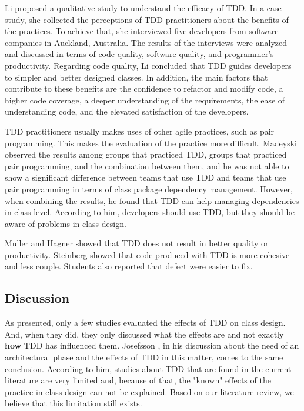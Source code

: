 \documentclass[times]{speauth}
\begin{document}
Li \cite{angela-li} proposed a qualitative study to understand the efficacy of TDD.
In a case study, she collected the perceptions of TDD practitioners about the
benefits of the practices. To achieve that, she interviewed five developers
from software companies in Auckland, Australia. The results of the interviews
were analyzed and discussed in terms of code quality, software quality, and
programmer's productivity. Regarding code quality, Li concluded that TDD
guides developers to simpler and better designed classes. In addition, the main
factors that contribute to these benefits are the confidence to refactor and
modify code, a higher code coverage, a deeper understanding of the requirements,
the ease of understanding code, and the elevated
satisfaction of the developers.

TDD practitioners usually makes uses of other agile practices, such as
pair programming. This makes the evaluation of the practice more difficult.
Madeyski \cite{madeyski-package-dependencies} observed the results
among groups that practiced TDD, groups that practiced pair programming,
and the combination between them, and he was not able to show a significant
difference between teams that use TDD and teams that use pair programming
in terms of class package dependency management. However, when combining
the results, he found that TDD can help managing dependencies in class level.
According to him, developers should use TDD, but they should be aware of 
problems in class design.

Muller and Hagner \cite{muller-e-hagner} showed that TDD does not result in
better quality or productivity. Steinberg \cite{steinberg} showed that
code produced with TDD is more cohesive and less couple. Students also reported
that defect were easier to fix.

\subsection{Discussion}

As presented, only a few studies evaluated the effects of TDD on class design.
And, when they did, they only discussed what the effects are and not exactly
\textbf{how} TDD has influenced them. Josefsson \cite{josefsson}, in his discussion
about the need of an architectural phase and the effects of TDD in this matter,
comes to the same conclusion. According to him, studies about TDD that are
found in the current literature are very limited and, because of that, the
"known" effects of the practice in class design can not be explained. Based on
our literature review, we believe that this limitation still exists.
\end{document}
